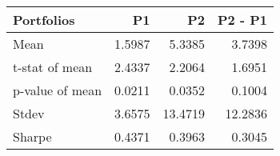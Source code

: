\begin{tabular}{lrrr}
\toprule
Portfolios & P1 & P2 & P2 - P1 \\
\midrule
Mean & 1.5987 & 5.3385 & 3.7398 \\
t-stat of mean & 2.4337 & 2.2064 & 1.6951 \\
p-value of mean & 0.0211 & 0.0352 & 0.1004 \\
Stdev & 3.6575 & 13.4719 & 12.2836 \\
Sharpe & 0.4371 & 0.3963 & 0.3045 \\
\bottomrule
\end{tabular}
